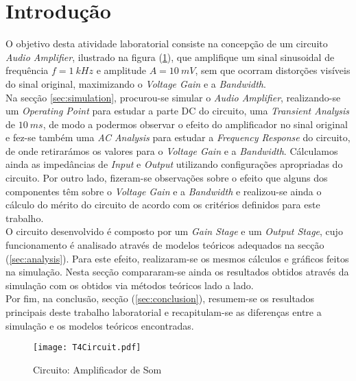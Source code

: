 \clearpage

\section{Introdução}
\label{sec:introduction}

O objetivo desta atividade laboratorial consiste na concepção de um circuito \emph{Audio Amplifier}, ilustrado na figura
(\ref{fig:Circuito}), que amplifique um sinal sinusoidal de frequência $f = 1 \: kHz$ e amplitude $A = 10 \: mV$, sem
que ocorram distorções visíveis do sinal original, maximizando o \emph{Voltage Gain} e a \emph{Bandwidth}.
\\
Na secção \ref{sec:simulation}, procurou-se simular o \emph{Audio Amplifier}, realizando-se um \emph{Operating Point}
para estudar a parte DC do circuito, uma \emph{Transient Analysis} de $10 \: ms$, de modo a podermos observar o efeito
do amplificador no sinal original e fez-se também uma \emph{AC Analysis} para estudar a \emph{Frequency Response} do
circuito, de onde retirarámos os valores para o \emph{Voltage Gain} e a \emph{Bandwidth}.
Cálculamos ainda as impedâncias de \emph{Input} e \emph{Output} utilizando configurações apropriadas do circuito.
Por outro lado, fizeram-se observações sobre o efeito que alguns dos componentes têm sobre o \emph{Voltage Gain} e 
a \emph{Bandwidth} e realizou-se ainda o cálculo do mérito do circuito de acordo com os critérios definidos para
este trabalho.
\\
O circuito desenvolvido é composto por um \emph{Gain Stage} e um \emph{Output Stage}, cujo funcionamento é analisado
através de modelos teóricos adequados na secção (\ref{sec:analysis}). Para este efeito, realizaram-se os mesmos cálculos
e gráficos feitos na simulação. Nesta secção compararam-se ainda os resultados obtidos através da simulação com os obtidos
via métodos teóricos lado a lado.
\\
Por fim, na conclusão, secção (\ref{sec:conclusion}), resumem-se os resultados principais deste trabalho laboratorial
e recapitulam-se as diferenças entre a simulação e os modelos teóricos encontradas.

\begin{figure}[H] \centering
    \texttt{[image: T4Circuit.pdf]}
    \caption{Circuito: Amplificador de Som}
    \label{fig:Circuito}
\end{figure}